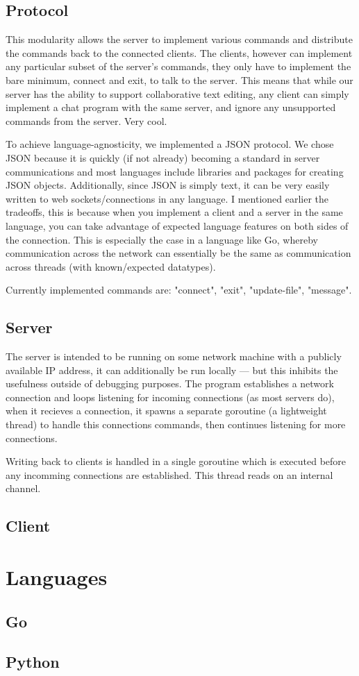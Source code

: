 \documentclass[10pt, letterpaper]{article}
\begin{document}
\subsection*{Protocol}

This modularity allows the server to implement various commands and 
distribute the commands back to the connected clients. The clients, however 
can implement any particular subset of the server's commands, they only have 
to implement the bare minimum, connect and exit, to talk to the server. This 
means that while our server has the ability to support collaborative text 
editing, any client can simply implement a chat program with the same server, 
and ignore any unsupported commands from the server. Very cool.

To achieve language-agnosticity, we implemented a JSON protocol. We chose 
JSON because it is quickly (if not already) becoming a standard in server 
communications and most languages include libraries and packages for creating 
JSON objects. Additionally, since JSON is simply text, it can be very easily 
written to web sockets/connections in any language. I mentioned earlier the 
tradeoffs, this is because when you implement a client and a server in the 
same language, you can take advantage of expected language features on both 
sides of the connection. This is especially the case in a language like Go, 
whereby communication across the network can essentially be the same as 
communication across threads (with known/expected datatypes).

Currently implemented commands are: "connect", "exit", "update-file", 
"message".

\subsection*{Server}

The server is intended to be running on some network machine with a publicly 
available IP address, it can additionally be run locally --- but this inhibits 
the usefulness outside of debugging purposes. The program establishes a 
network connection and loops listening for incoming connections (as most 
servers do), when it recieves a connection, it spawns a separate goroutine 
(a lightweight thread) to handle this connections commands, then continues 
listening for more connections.

Writing back to clients is handled in a single goroutine which is executed 
before any incomming connections are established. This thread reads on an 
internal channel.

\subsection*{Client}

\section*{Languages}

\subsection*{Go}

\subsection*{Python}
\end{document}
